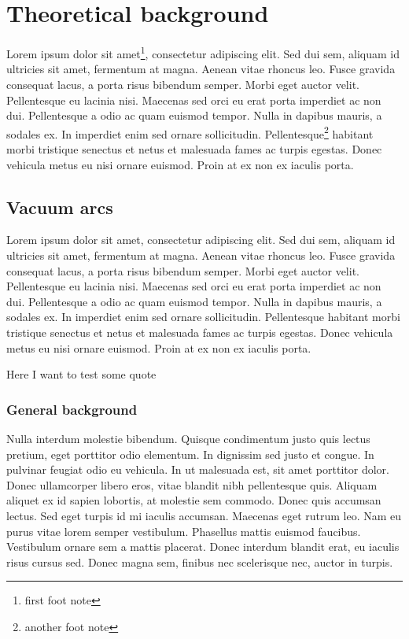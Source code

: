 \chapter[Theoretical background]{Theoretical background}
Lorem ipsum dolor sit amet\footnote{first foot note}, consectetur adipiscing elit. Sed dui sem, aliquam id ultricies sit amet, fermentum at magna. Aenean vitae rhoncus leo. Fusce gravida consequat lacus, a porta risus bibendum semper. Morbi eget auctor velit. Pellentesque eu lacinia nisi. Maecenas sed orci eu erat porta imperdiet ac non dui. Pellentesque a odio ac quam euismod tempor. Nulla in dapibus mauris, a sodales ex. In imperdiet enim sed ornare sollicitudin. Pellentesque\footnote{another foot note} habitant morbi tristique senectus et netus et malesuada fames ac turpis egestas. Donec vehicula metus eu nisi ornare euismod. Proin at ex non ex iaculis porta.

\section[Vacuum arcs]{Vacuum arcs}
Lorem ipsum dolor sit amet, consectetur adipiscing elit. Sed dui sem, aliquam id ultricies sit amet, fermentum at magna. Aenean vitae rhoncus leo. Fusce gravida consequat lacus, a porta risus bibendum semper. Morbi eget auctor velit. Pellentesque eu lacinia nisi. Maecenas sed orci eu erat porta imperdiet ac non dui. Pellentesque a odio ac quam euismod tempor. Nulla in dapibus mauris, a sodales ex. In imperdiet enim sed ornare sollicitudin. Pellentesque habitant morbi tristique senectus et netus et malesuada fames ac turpis egestas. Donec vehicula metus eu nisi ornare euismod. Proin at ex non ex iaculis porta.

Here I want to test\cite{einstein} some\cite{latexcompanion} quote\cite{knuthwebsite}

\subsection[General background]{General background}
Nulla interdum molestie bibendum. Quisque condimentum justo quis lectus pretium, eget porttitor odio elementum. In dignissim sed justo et congue. In pulvinar feugiat odio eu vehicula. In ut malesuada est, sit amet porttitor dolor. Donec ullamcorper libero eros, vitae blandit nibh pellentesque quis. Aliquam aliquet ex id sapien lobortis, at molestie sem commodo. Donec quis accumsan lectus. Sed eget turpis id mi iaculis accumsan. Maecenas eget rutrum leo. Nam eu purus vitae lorem semper vestibulum. Phasellus mattis euismod faucibus. Vestibulum ornare sem a mattis placerat. Donec interdum blandit erat, eu iaculis risus cursus sed. Donec magna sem, finibus nec scelerisque nec, auctor in turpis.

